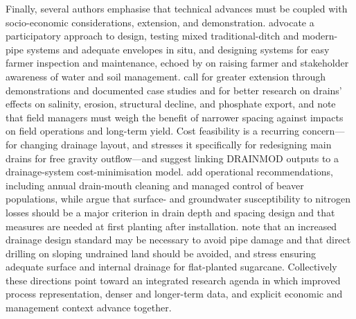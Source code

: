 Finally, several authors emphasise that technical advances must be coupled with
socio-economic considerations, extension, and demonstration.
\textcite{BenAissa2013} advocate a participatory approach to design, testing
mixed traditional-ditch and modern-pipe systems and adequate envelopes in situ,
and designing systems for easy farmer inspection and maintenance, echoed by
\textcite{HajAmor2019} on raising farmer and stakeholder awareness of water and
soil management. \textcite{MCFARLANE1992} call for greater extension through
demonstrations and documented case studies and for better research on drains'
effects on salinity, erosion, structural decline, and phosphate export, and
\textcite{Mante2018} note that field managers must weigh the benefit of
narrower spacing against impacts on field operations and long-term yield.
Cost feasibility is a recurring concern---for changing drainage layout, and
\textcite{Imran2021} stresses it specifically for redesigning main drains for
free gravity outflow---and \textcite{Malota2015} suggest linking DRAINMOD
outputs to a drainage-system cost-minimisation model. \textcite{Lamsodis2011}
add operational recommendations, including annual drain-mouth cleaning and
managed control of beaver populations, while \textcite{DarziNaftchali2017}
argue that surface- and groundwater susceptibility to nitrogen losses should be
a major criterion in drain depth and spacing design and that measures are
needed at first planting after installation. \textcite{HARRIS1993} note that
an increased drainage design standard may be necessary to avoid pipe damage and
that direct drilling on sloping undrained land should be avoided, and
\textcite{CAMP1982} stress ensuring adequate surface and internal drainage for
flat-planted sugarcane. Collectively these directions point toward an
integrated research agenda in which improved process representation, denser and
longer-term data, and explicit economic and management context advance
together.